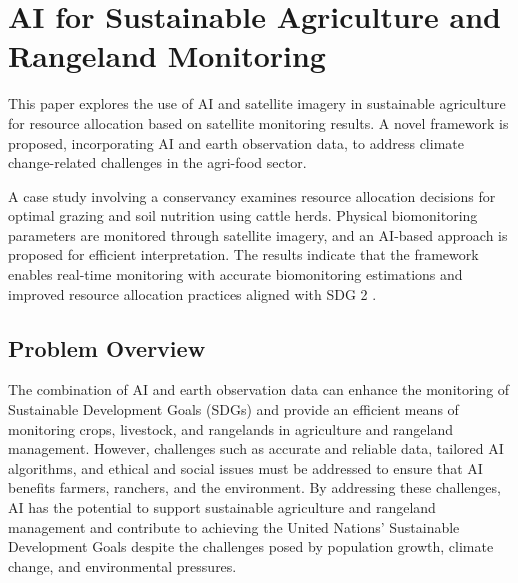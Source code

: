 \documentclass[draft, {\secondLanguage}, english]{volcanica-template}
\begin{document}

\section{AI for Sustainable Agriculture and Rangeland Monitoring}\label{sec:02}
This paper \parencite{Efremova2023} explores the use of AI and satellite imagery in sustainable agriculture for resource allocation based on satellite monitoring results. A novel framework is proposed, incorporating AI and earth observation data, to address climate change-related challenges in the agri-food sector.

A case study involving a conservancy examines resource allocation decisions for optimal grazing and soil nutrition using cattle herds. Physical biomonitoring parameters are monitored through satellite imagery, and an AI-based approach is proposed for efficient interpretation. The results indicate that the framework enables real-time monitoring with accurate biomonitoring estimations and improved resource allocation practices aligned with SDG 2 \parencite{Efremova2023}.

\subsection{Problem Overview}\label{sec:02a}
The combination of AI and earth observation data can enhance the monitoring of Sustainable Development Goals (SDGs) and provide an efficient means of monitoring crops, livestock, and rangelands in agriculture and rangeland management. However, challenges such as accurate and reliable data, tailored AI algorithms, and ethical and social issues must be addressed to ensure that AI benefits farmers, ranchers, and the environment. By addressing these challenges, AI has the potential to support sustainable agriculture and rangeland management and contribute to achieving the United Nations' Sustainable Development Goals despite the challenges posed by population growth, climate change, and environmental pressures.
\end{document}

